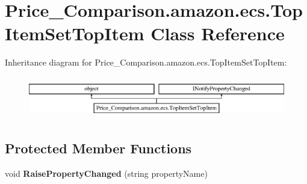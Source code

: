 \hypertarget{class_price___comparison_1_1amazon_1_1ecs_1_1_top_item_set_top_item}{\section{Price\-\_\-\-Comparison.\-amazon.\-ecs.\-Top\-Item\-Set\-Top\-Item Class Reference}
\label{class_price___comparison_1_1amazon_1_1ecs_1_1_top_item_set_top_item}
}


 


Inheritance diagram for Price\-\_\-\-Comparison.\-amazon.\-ecs.\-Top\-Item\-Set\-Top\-Item\-:\begin{figure}[H]
\begin{center}
\leavevmode
\includegraphics[height=1.848185cm]{class_price___comparison_1_1amazon_1_1ecs_1_1_top_item_set_top_item}
\end{center}
\end{figure}
\subsection*{Protected Member Functions}
\begin{DoxyCompactItemize}
\item 
\hypertarget{class_price___comparison_1_1amazon_1_1ecs_1_1_top_item_set_top_item_af8078ea1fe41077c7a7477081b8e1e5d}{void {\bfseries Raise\-Property\-Changed} (string property\-Name)}\label{class_price___comparison_1_1amazon_1_1ecs_1_1_top_item_set_top_item_af8078ea1fe41077c7a7477081b8e1e5d}

\end{DoxyCompactItemize}
